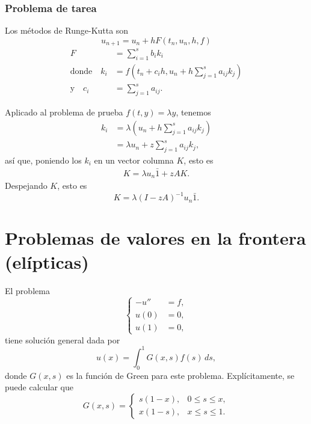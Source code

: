 \documentclass[11pt,letterpaper]{report}
\begin{document}
\subsection{Problema de tarea}

Los métodos de Runge-Kutta son
\begin{equation}
  u_{n+1} = u_n + h F(t_n,u_n,h,f)
\end{equation}
\begin{align}
  F
    &=
    \sum_{i=1}^{s}b_ik_i
  \\[-3mm]
  \text{donde} \quad
  k_i
    &= f(t_n+c_ih, u_n+h \sum_{j=1}^{s}a_{ij} k_j)
    \\[-4mm]
  \text{y} \quad
  c_i
    &= \sum_{j=1}^{s}a_{ij}
.\end{align}

Aplicado al problema de prueba $f(t,y)=\lambda y$, tenemos
\begin{align}
  k_i
  &= \lambda(u_n+h \sum_{j=1}^{s}a_{ij} k_j) \\
  &= \lambda u_n+z \sum_{j=1}^{s}a_{ij} k_j
,\end{align}
así que, poniendo los $k_i$ en un vector columna $K$, esto es
\begin{align}
  K = \lambda u_n\bar 1+zAK
.\end{align}
Despejando $K$, esto es
\begin{equation}
  K=\lambda (I-zA)^{-1}u_n\bar 1
.\end{equation}

\chapter{Problemas de valores en la frontera (elípticas)}

El problema
\begin{equation}
  \left\{
    \begin{aligned}
      -u'' &= f, \\
      u(0) &= 0, \\
      u(1) &= 0,
    \end{aligned}
  \right.
\end{equation}
tiene solución general dada por
\begin{equation}
  u(x) = \int_{0}^{1}G(x,s)f(s)\,ds,
\end{equation}
donde $G(x,s)$ es la función de Green para este problema.
Explícitamente, se puede calcular que
\begin{equation}
  G(x,s)
  =
  \begin{cases}
    s(1-x), & 0\leq s\leq x, \\
    x(1-s), & x\leq s\leq 1.
  \end{cases}
\end{equation}
\end{document}
